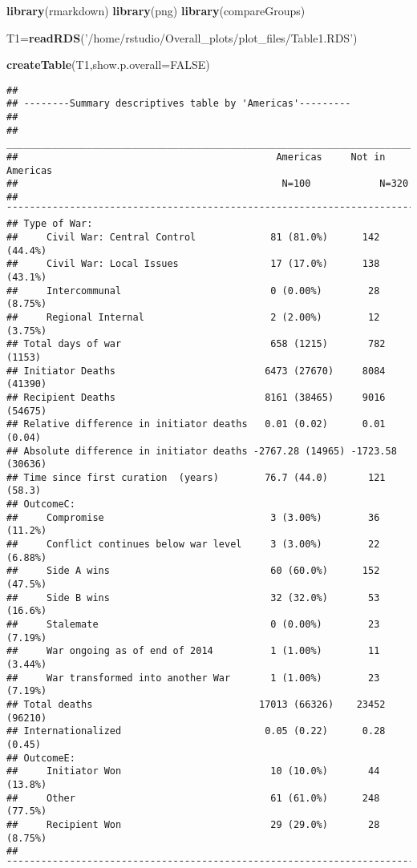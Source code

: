 \documentclass[
]{article}
\newenvironment{Shaded}{\begin{snugshade}}{\end{snugshade}}
\newcommand{\DataTypeTok}[1]{\textcolor[rgb]{0.13,0.29,0.53}{#1}}
\newcommand{\KeywordTok}[1]{\textcolor[rgb]{0.13,0.29,0.53}{\textbf{#1}}}
\newcommand{\NormalTok}[1]{#1}
\newcommand{\OtherTok}[1]{\textcolor[rgb]{0.56,0.35,0.01}{#1}}
\newcommand{\StringTok}[1]{\textcolor[rgb]{0.31,0.60,0.02}{#1}}
\begin{document}
\begin{Shaded}
\begin{Highlighting}[]
\KeywordTok{library}\NormalTok{(rmarkdown)}
\KeywordTok{library}\NormalTok{(png)}
\KeywordTok{library}\NormalTok{(compareGroups)}

\NormalTok{T1=}\KeywordTok{readRDS}\NormalTok{(}\StringTok{'/home/rstudio/Overall_plots/plot_files/Table1.RDS'}\NormalTok{)}

\KeywordTok{createTable}\NormalTok{(T1,}\DataTypeTok{show.p.overall=}\OtherTok{FALSE}\NormalTok{)}
\end{Highlighting}
\end{Shaded}

\begin{verbatim}
## 
## --------Summary descriptives table by 'Americas'---------
## 
## _________________________________________________________________________ 
##                                             Americas     Not in Americas  
##                                              N=100            N=320       
## ¯¯¯¯¯¯¯¯¯¯¯¯¯¯¯¯¯¯¯¯¯¯¯¯¯¯¯¯¯¯¯¯¯¯¯¯¯¯¯¯¯¯¯¯¯¯¯¯¯¯¯¯¯¯¯¯¯¯¯¯¯¯¯¯¯¯¯¯¯¯¯¯¯ 
## Type of War:                                                              
##     Civil War: Central Control             81 (81.0%)      142 (44.4%)    
##     Civil War: Local Issues                17 (17.0%)      138 (43.1%)    
##     Intercommunal                          0 (0.00%)        28 (8.75%)    
##     Regional Internal                      2 (2.00%)        12 (3.75%)    
## Total days of war                          658 (1215)       782 (1153)    
## Initiator Deaths                          6473 (27670)     8084 (41390)   
## Recipient Deaths                          8161 (38465)     9016 (54675)   
## Relative difference in initiator deaths   0.01 (0.02)      0.01 (0.04)    
## Absolute difference in initiator deaths -2767.28 (14965) -1723.58 (30636) 
## Time since first curation  (years)        76.7 (44.0)       121 (58.3)    
## OutcomeC:                                                                 
##     Compromise                             3 (3.00%)        36 (11.2%)    
##     Conflict continues below war level     3 (3.00%)        22 (6.88%)    
##     Side A wins                            60 (60.0%)      152 (47.5%)    
##     Side B wins                            32 (32.0%)       53 (16.6%)    
##     Stalemate                              0 (0.00%)        23 (7.19%)    
##     War ongoing as of end of 2014          1 (1.00%)        11 (3.44%)    
##     War transformed into another War       1 (1.00%)        23 (7.19%)    
## Total deaths                             17013 (66326)    23452 (96210)   
## Internationalized                         0.05 (0.22)      0.28 (0.45)    
## OutcomeE:                                                                 
##     Initiator Won                          10 (10.0%)       44 (13.8%)    
##     Other                                  61 (61.0%)      248 (77.5%)    
##     Recipient Won                          29 (29.0%)       28 (8.75%)    
## ¯¯¯¯¯¯¯¯¯¯¯¯¯¯¯¯¯¯¯¯¯¯¯¯¯¯¯¯¯¯¯¯¯¯¯¯¯¯¯¯¯¯¯¯¯¯¯¯¯¯¯¯¯¯¯¯¯¯¯¯¯¯¯¯¯¯¯¯¯¯¯¯¯
\end{verbatim}
\end{document}
